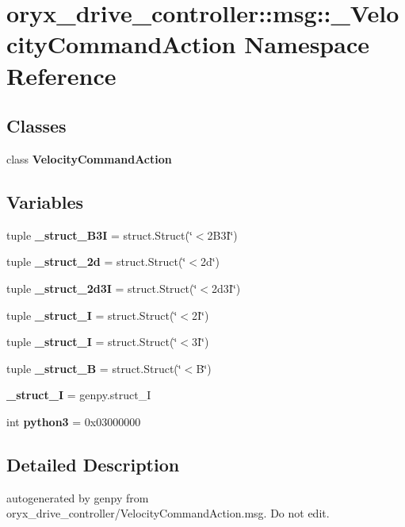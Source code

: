\section{oryx\-\_\-drive\-\_\-controller\-:\-:msg\-:\-:\-\_\-\-Velocity\-Command\-Action \-Namespace \-Reference}
\label{namespaceoryx__drive__controller_1_1msg_1_1__VelocityCommandAction}
\subsection*{\-Classes}
\begin{DoxyCompactItemize}
\item 
class {\bf \-Velocity\-Command\-Action}
\end{DoxyCompactItemize}
\subsection*{\-Variables}
\begin{DoxyCompactItemize}
\item 
tuple {\bf \-\_\-struct\-\_\-B3\-I} = struct.\-Struct(\char`\"{}$<$2\-B3\-I\char`\"{})
\item 
tuple {\bf \-\_\-struct\-\_\-2d} = struct.\-Struct(\char`\"{}$<$2d\char`\"{})
\item 
tuple {\bf \-\_\-struct\-\_\-2d3\-I} = struct.\-Struct(\char`\"{}$<$2d3\-I\char`\"{})
\item 
tuple {\bf \-\_\-struct\-\_\-I} = struct.\-Struct(\char`\"{}$<$2\-I\char`\"{})
\item 
tuple {\bf \-\_\-struct\-\_\-I} = struct.\-Struct(\char`\"{}$<$3\-I\char`\"{})
\item 
tuple {\bf \-\_\-struct\-\_\-\-B} = struct.\-Struct(\char`\"{}$<$\-B\char`\"{})
\item 
{\bf \-\_\-struct\-\_\-\-I} = genpy.\-struct\-\_\-\-I
\item 
int {\bf python3} = 0x03000000
\end{DoxyCompactItemize}


\subsection{\-Detailed \-Description}
\begin{DoxyVerb}autogenerated by genpy from oryx_drive_controller/VelocityCommandAction.msg. Do not edit.\end{DoxyVerb}
 

